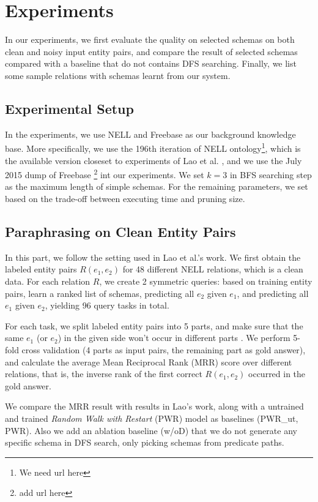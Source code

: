 \section{Experiments}

In our experiments, we first evaluate the quality on selected schemas on
both clean and noisy input entity pairs, and compare the result of selected 
schemas compared with a baseline that do not contains DFS searching.
Finally, we list some sample relations with schemas learnt from our system.

\subsection{Experimental Setup}
In the experiments, we use NELL and Freebase as our background knowledge base.
More specifically, we use the 196th iteration of NELL ontology\footnote{We need url here}, 
which is the available version closeset to experiments of Lao et al. 
, and we use the July 2015 dump of Freebase 
\footnote{add url here} int our experiments.
We set $k = 3$ in BFS searching step as the maximum length of simple schemas.
For the remaining parameters, we set  based on the trade-off
between executing time and pruning size.

\subsection{Paraphrasing on Clean Entity Pairs}
In this part, we follow the setting used in Lao et al.'s work. We first obtain the labeled
entity pairs $R(e_1, e_2)$ for 48 different NELL relations, which is a clean data.
For each relation $R$, we create 2 symmetric queries: based on training entity pairs, 
learn a ranked list of schemas, predicting all $e_2$ given $e_1$, and predicting all 
$e_1$ given $e_2$, yielding 96 query tasks in total. 

For each task, we split labeled entity pairs into 5 parts, and make sure that 
the same $e_1$ (or $e_2$) in the given side won't occur in different parts .
We perform 5-fold cross validation (4 parts as input pairs, the remaining part as gold answer),
and calculate the average Mean Reciprocal Rank (MRR) score over different relations, that is, 
the inverse rank of the first correct $R(e_1, e_2)$ occurred in the gold answer.

We compare the MRR result with results in Lao's work, along with a untrained and trained
\textit{Random Walk with Restart} (PWR) model \cite{Haveliwala2002topic} as baselines (PWR\_ut, PWR).
Also we add an ablation baseline (w/oD) that we do not generate any specific schema in
DFS search, only picking schemas from predicate paths.

